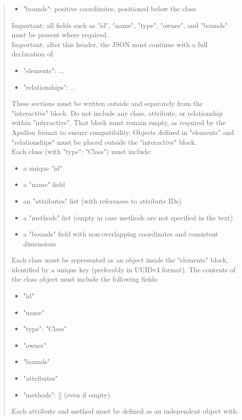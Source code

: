 \begin{quote}
\begin{itemize}
        \item "bounds": positive coordinates, positioned below the class
    \end{itemize}
    Important: all fields such as "id", "name", "type", "owner", and "bounds" must be present where required.\\
    Important: after this header, the JSON must continue with a full declaration of:
    \begin{itemize}
        \item "elements": { ... }
        \item "relationships": { ... }
    \end{itemize}
    These sections must be written outside and separately from the "interactive" block. Do not include any class, attribute, or relationship within "interactive". That block must remain empty, as required by the Apollon format to ensure compatibility. Objects defined in "elements" and "relationships" must be placed outside the "interactive" block.\\
    Each class (with "type": "Class") must include:
    \begin{itemize}
        \item a unique "id"
        \item a "name" field
        \item an "attributes" list (with references to attribute IDs)
        \item a "methods" list (empty in case methods are not specified in the text)
        \item a "bounds" field with non-overlapping coordinates and consistent dimensions
    \end{itemize}
    Each class must be represented as an object inside the "elements" block, identified by a unique key (preferably in UUIDv4 format). The contents of the class object must include the following fields:
    \begin{itemize}
        \item "id"
        \item "name"
        \item "type": "Class"
        \item "owner"
        \item "bounds"
        \item "attributes"
        \item "methods": [] (even if empty)
    \end{itemize}
    Each attribute and method must be defined as an independent object with:

\end{quote}

